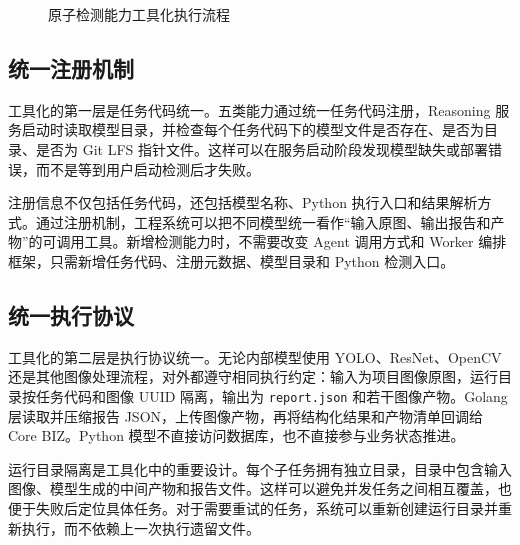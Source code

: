 \begin{figure}[!htb]
{
  }
  \caption{原子检测能力工具化执行流程}\label{fig:design-atomic-detection-tooling-flow}
\end{figure}

\subsection{统一注册机制}
\label{subsec:design-atomic-capability-registration}

工具化的第一层是任务代码统一。五类能力通过统一任务代码注册，Reasoning 服务启动时读取模型目录，并检查每个任务代码下的模型文件是否存在、是否为目录、是否为 Git LFS 指针文件。这样可以在服务启动阶段发现模型缺失或部署错误，而不是等到用户启动检测后才失败。

注册信息不仅包括任务代码，还包括模型名称、Python 执行入口和结果解析方式。通过注册机制，工程系统可以把不同模型统一看作“输入原图、输出报告和产物”的可调用工具。新增检测能力时，不需要改变 Agent 调用方式和 Worker 编排框架，只需新增任务代码、注册元数据、模型目录和 Python 检测入口。

\subsection{统一执行协议}
\label{subsec:design-atomic-execution-protocol}

工具化的第二层是执行协议统一。无论内部模型使用 YOLO、ResNet、OpenCV 还是其他图像处理流程，对外都遵守相同执行约定：输入为项目图像原图，运行目录按任务代码和图像 UUID 隔离，输出为 \texttt{report.json} 和若干图像产物。Golang 层读取并压缩报告 JSON，上传图像产物，再将结构化结果和产物清单回调给 Core BIZ。Python 模型不直接访问数据库，也不直接参与业务状态推进。

运行目录隔离是工具化中的重要设计。每个子任务拥有独立目录，目录中包含输入图像、模型生成的中间产物和报告文件。这样可以避免并发任务之间相互覆盖，也便于失败后定位具体任务。对于需要重试的任务，系统可以重新创建运行目录并重新执行，而不依赖上一次执行遗留文件。


